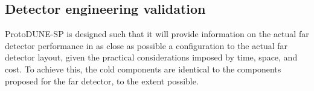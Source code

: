 
\subsection{Detector engineering validation}  


ProtoDUNE-SP is designed such that it will provide information on the actual far detector performance in as close as possible a configuration to the actual far detector layout, given the practical considerations imposed by time, space, and cost. To achieve this, the cold components are identical to the components proposed for the far detector, to the extent possible. 


